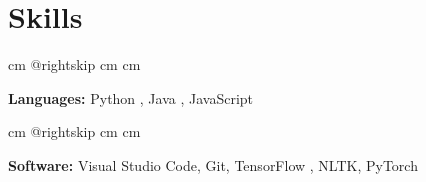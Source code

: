 \documentclass[10pt, letterpaper]{article}
\begin{document}
    
    \section{Skills}

        \begingroup{} cm
        \advance\csname @rightskip cm
        \advance{} cm

        \textbf{Languages:}  Python , Java ,  JavaScript   \par\endgroup

        \vspace{0.2 cm}
        \begingroup{} cm
        \advance\csname @rightskip cm
        \advance{} cm

        \textbf{Software:} Visual Studio Code, Git, TensorFlow , NLTK, PyTorch \par\endgroup


    
\end{document}
